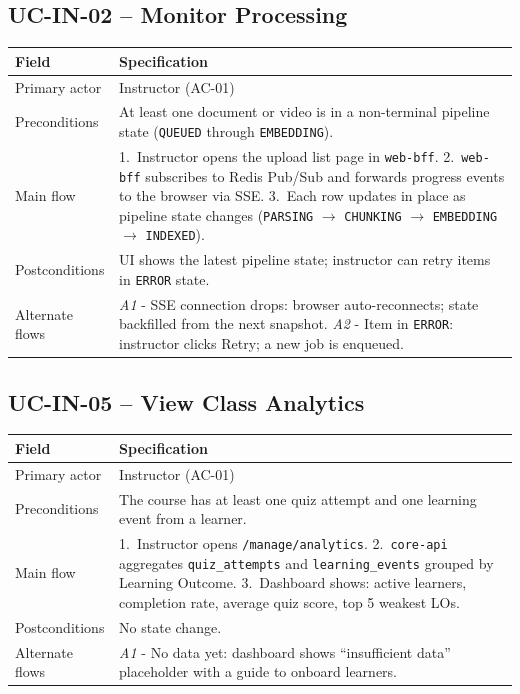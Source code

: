 \subsection{UC-IN-02 -- Monitor Processing}

\begin{longtable}{|p{3.2cm}|p{10.3cm}|}
\hline
\textbf{Field} & \textbf{Specification} \\
\hline
\endhead
Primary actor & Instructor (AC-01) \\
\hline
Preconditions & At least one document or video is in a non-terminal
    pipeline state (\texttt{QUEUED} through \texttt{EMBEDDING}). \\
\hline
Main flow &
    1.\ Instructor opens the upload list page in \texttt{web-bff}.
    2.\ \texttt{web-bff} subscribes to Redis Pub/Sub and forwards
    progress events to the browser via SSE.
    3.\ Each row updates in place as pipeline state changes
    (\texttt{PARSING} $\to$ \texttt{CHUNKING} $\to$ \texttt{EMBEDDING}
    $\to$ \texttt{INDEXED}). \\
\hline
Postconditions & UI shows the latest pipeline state; instructor can
    retry items in \texttt{ERROR} state. \\
\hline
Alternate flows &
    \emph{A1} - SSE connection drops: browser auto-reconnects; state
    backfilled from the next snapshot.
    \emph{A2} - Item in \texttt{ERROR}: instructor clicks Retry; a
    new job is enqueued. \\
\hline
\end{longtable}

\subsection{UC-IN-05 -- View Class Analytics}

\begin{longtable}{|p{3.2cm}|p{10.3cm}|}
\hline
\textbf{Field} & \textbf{Specification} \\
\hline
\endhead
Primary actor & Instructor (AC-01) \\
\hline
Preconditions & The course has at least one quiz attempt and one
    learning event from a learner. \\
\hline
Main flow &
    1.\ Instructor opens \texttt{/manage/analytics}.
    2.\ \texttt{core-api} aggregates \texttt{quiz\_attempts} and
    \texttt{learning\_events} grouped by Learning Outcome.
    3.\ Dashboard shows: active learners, completion rate, average
    quiz score, top 5 weakest LOs. \\
\hline
Postconditions & No state change. \\
\hline
Alternate flows &
    \emph{A1} - No data yet: dashboard shows ``insufficient data''
    placeholder with a guide to onboard learners. \\
\hline
\end{longtable}

